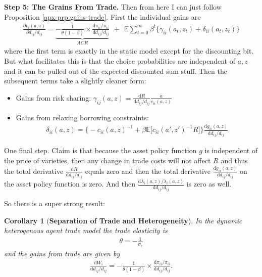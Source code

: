 \documentclass[12pt,pdftex]{article}
\newtheorem{corr}{Corollary}
\begin{document}
\begin{onehalfspacing}
\textbf{Step 5: The Grains From Trade.} Then from here I can just follow Proposition \ref{apx-prp:gains-trade}. First the individual gains are
{\footnotesize
\begin{align}
\nonumber
\frac{\partial v_i(a, z)}{\partial d_{ij} / d_{ij}} = \underbrace{-\frac{1}{\theta (1-\beta)} \times \frac{\mathrm{d} \pi_{ii} / \pi_{ii}}{\mathrm{d}d_{ij} / d_{ij}}}_{ACR} \ \ + \ \  
\mathbb{E} \sum_{t = 0}^{\infty} \beta^{t} \bigg \{ \gamma_{ii}(a_{t},z_{t}) + \delta_{ii}(a_{t},z_{t}) \bigg \}
\end{align}
}where the first term is exactly in the static model except for the discounting bit. But what facilitates this is that the choice probabilities are independent of $a,z$ and it can be pulled out of the expected discounted sum stuff. Then the subsequent terms take a slightly cleaner form:
\begin{itemize}
\item Gains from risk sharing: $\gamma_{ij}(a,z) = \frac{\mathrm{d} R}{\mathrm{d} d_{ij} / d_{ij}}\frac{a}{c_{ii}(a,z)}$
\item Gains from relaxing borrowing constraints:
\begin{align}
\nonumber
\delta_{ii}(a,z) = \bigg \{- c_{ii}(a,z)^{-1} + \beta \mathbb{E} \big [ c_{ii}(a',z')^{-1}R \big ] \bigg \}\frac{\mathrm{d} g_{ii}(a,z)}{\mathrm{d} d_{ij} / d_{ij}}
\end{align}
\end{itemize}
One final step. Claim is that because the asset policy function $g$ is independent of the price of varieties, then any change in trade costs will not affect $R$ and thus the total derivative $\frac{\mathrm{d} R}{\mathrm{d} d_{ij} / d_{ij}}$ equals zero and then the total derivative $\frac{\mathrm{d} g_{ii}(a,z)}{\mathrm{d} d_{ij} / d_{ij}}$ on the asset policy function is zero. And then $\frac{\mathrm{d} \lambda_{i}(a,z)/ \lambda_{i}(a,z)}{\mathrm{d} d_{ij} / d_{ij}}$ is zero as well. 

So there is a super strong result:
\begin{corr}[\textbf{Separation of Trade and Heterogeneity}] In the dynamic heterogenous agent trade model the trade elasticity is
\begin{align}
\theta = -\frac{1}{\sigma_{\epsilon}} \nonumber
\end{align}
and the gains from trade are given by
\begin{align}
\frac{\mathrm{d} W_{i}}{\mathrm{d} d_{ij} / d_{ij}} = -\frac{1}{\theta (1-\beta)} \times \frac{\mathrm{d} \pi_{ii} / \pi_{ii}}{\mathrm{d}d_{ij} / d_{ij}}.
\end{align}
\end{corr}



\end{onehalfspacing}
\end{document}

